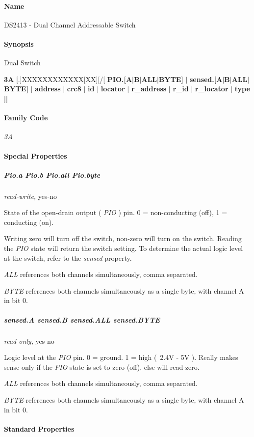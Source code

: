 \paragraph*{Name}
DS2413 - Dual Channel Addressable Switch 
\paragraph*{Synopsis}
Dual Switch


\textbf{3A} [.]XXXXXXXXXXXX[XX][/[ \textbf{PIO.[A$|$B$|$ALL$|$BYTE]} $|$ \textbf{sensed.[A$|$B$|$ALL$|$BYTE]} $|$           \textbf{address}
$|$ \textbf{crc8} $|$ \textbf{id} $|$ \textbf{locator} $|$ \textbf{r\_address} $|$ \textbf{r\_id} $|$ \textbf{r\_locator} $|$ \textbf{type}  ]] 
\paragraph*{Family Code}


\textit{3A}

\paragraph*{Special Properties}

\subparagraph*{Pio.a Pio.b Pio.all Pio.byte}\textit{read-write,} yes-no 

State of the open-drain output ( \textit{PIO} ) pin. 0 = non-conducting (off), 1 =
\textsf{conducting (on)}. 

Writing zero will turn off the switch, non-zero will turn on the switch.
Reading the \textit{PIO} state will return the switch setting. To determine the actual
logic level at the switch, refer to the \textit{sensed} property. 

\textit{ALL} references both channels simultaneously, comma separated. 

\textit{BYTE} references both channels simultaneously as a single byte, with channel
A in bit 0. 
\subparagraph*{sensed.A sensed.B sensed.ALL sensed.BYTE}\textit{read-only,} yes-no 

Logic level at the \textit{PIO} pin. 0 = ground. 1 = high (~2.4V - 5V ). Really makes
sense only if the \textit{PIO} state is set to zero (off), else will read zero. 

\textit{ALL} references both channels simultaneously, comma separated. 

\textit{BYTE} references both channels simultaneously as a single byte, with channel
A in bit 0. 
\paragraph*{Standard Properties}
          
